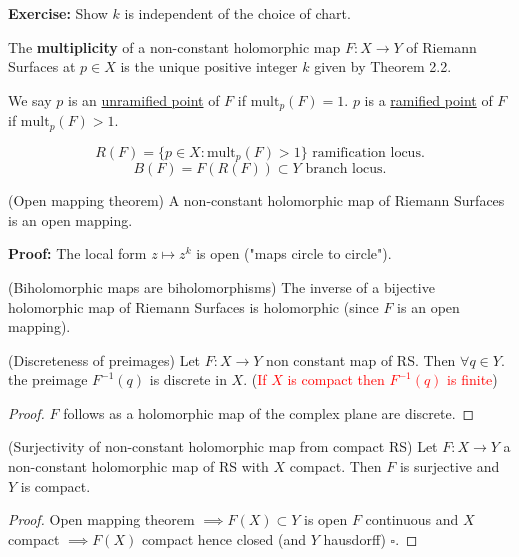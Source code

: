 \documentclass{article}
\begin{document}
\textbf{Exercise:}
Show $k$ is independent of the choice of chart.

\begin{definition}
    The \textbf{multiplicity} of a non-constant holomorphic map $F: X \to Y$
    of Riemann Surfaces at $p \in X$ is the unique positive integer $k$ given by
    Theorem 2.2.
\end{definition}

We say $p$ is an \underline{unramified point} of $F$ if $\mathrm{mult}_p(F) = 1$.
$p$ is a \underline{ramified point} of $F$ if $\mathrm{mult}_p(F) > 1$.

$$
R(F) = \{ p \in X : \mathrm{mult}_p(F) > 1 \} \text{ ramification locus.}
$$
$$
B(F) = F(R(F)) \subset Y \text{ branch locus.}
$$

\begin{theorem}
    (Open mapping theorem) \label{thm:openmapping}
    A non-constant holomorphic map of Riemann Surfaces is an open mapping.
\end{theorem}

\textbf{Proof:} The local form $z \mapsto z^k$ is open
("maps circle to circle").

\begin{theorem}
    (Biholomorphic maps are biholomorphisms) \label{thm:biholo}
    The inverse of a bijective holomorphic map of Riemann Surfaces is holomorphic
    (since $F$ is an open mapping).
\end{theorem}

\begin{theorem}
(Discreteness of preimages)
Let $F: X \to Y$ non constant map of RS. Then $\forall q \in Y$.
the preimage $F^{-1}(q)$ is discrete in $X$.
(\textcolor{red}{If $X$ is compact then $F^{-1}(q)$ is finite})
\end{theorem}

\begin{proof}
$F$ follows as a holomorphic map of the complex plane are discrete.
\end{proof}

\begin{theorem}
(Surjectivity of non-constant holomorphic map from compact RS)
Let $F: X \to Y$ a non-constant holomorphic map of RS with $X$ compact.
Then $F$ is surjective and $Y$ is compact.
\end{theorem}

\begin{proof}
Open mapping theorem $\implies F(X) \subset Y$ is open
$F$ continuous and $X$ compact $\implies F(X)$ compact hence closed (and $Y$ hausdorff) $\square$.
\end{proof}
\end{document}
